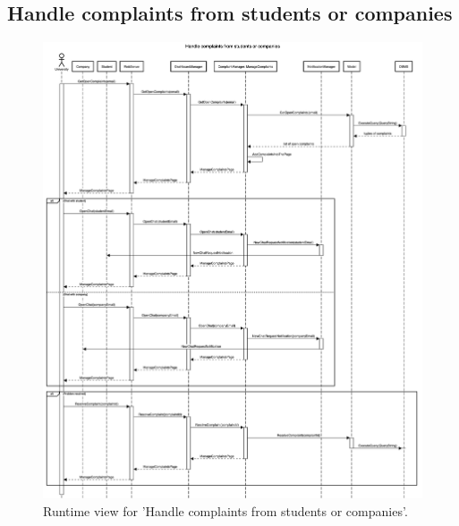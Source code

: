 \subsection{Handle complaints from students or companies}
\begin{figure}[H]
    \begin{center}
        \includegraphics[width=0.8\linewidth]{DD/LaTeX/Images/RuntimeView/HandleComplaints.png}
        \caption{Runtime view for 'Handle complaints from students or companies'.}
        \label{fig:runtime_HandleComplaints}%
    \end{center}
\end{figure}

